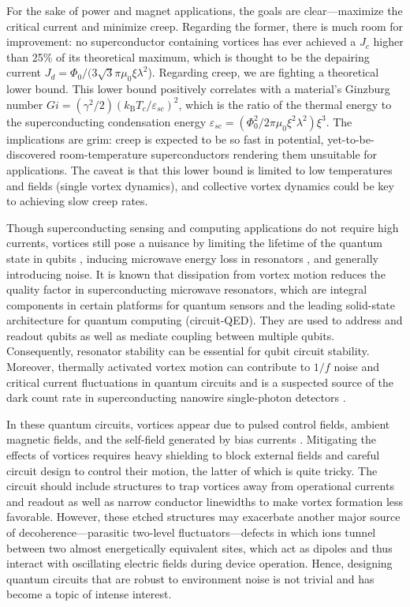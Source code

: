 \documentclass[%
 aip,
 amsmath,amssymb,
 reprint,%
floatfix]{revtex4-1}
\newcommand{\Tc}{T_{c}}
\newcommand{\Jc}{J_{c}}
\newcommand{\Jdp}{J_{d}}
\newcommand{\kB}{k_{\mathrm{B}}}
\begin{document}
For the sake of power and magnet applications, the goals are clear---maximize the critical current and minimize creep. Regarding the former, there is much room for improvement: no superconductor containing vortices has ever achieved a $\Jc$ higher than 25\% of its theoretical maximum, which is thought to be the depairing current $\Jdp=\Phi_0/(3\sqrt{3}\pi\mu_0 \xi \lambda^2$).  Regarding creep, we are fighting a theoretical lower bound.\cite{Eley2017a} This lower bound positively correlates with a material's Ginzburg number $Gi = (\gamma^2/2)(\kB \Tc/ \varepsilon_{sc})^2$, which is the ratio of the thermal energy to the superconducting condensation energy $\varepsilon_{sc} = (\Phi_{0}^{2} / 2 \pi \mu_{0} \xi^{2} \lambda^{2}) \xi^{3}$. The implications are grim: creep is expected to be so fast in potential, yet-to-be-discovered room-temperature superconductors rendering them unsuitable for applications. The caveat is that this lower bound is limited to low temperatures and fields (single vortex dynamics), and collective vortex dynamics could be key to achieving slow creep rates.

Though superconducting sensing and computing applications do not require high currents, vortices still pose a nuisance by limiting the lifetime of the quantum state in qubits \cite{Oliver2013}, inducing microwave energy loss in resonators \cite{Song2009a}, and generally introducing noise.  It is known that dissipation from vortex motion reduces the quality factor in superconducting microwave resonators, which are integral components in certain platforms for quantum sensors and the leading solid-state architecture for quantum computing (circuit-QED)\cite{Wallraff2004, Blais2004, Krantz2019, Muller2019}.  They are used to address and readout qubits as well as mediate coupling between multiple qubits. Consequently, resonator stability can be essential for qubit circuit stability.  Moreover, thermally activated vortex motion can contribute to $1/f$ noise and critical current fluctuations \cite{Trabaldo2019, VanHarlingen2004} in quantum circuits and is a suspected source of the dark count rate in superconducting nanowire single-photon detectors \cite{PhysRevB.83.144526, Yamashita2013}.



In these quantum circuits, vortices appear due to pulsed control fields, ambient magnetic fields\cite{Song2009}, and the self-field generated by bias currents \cite{Yamashita2013}.  Mitigating the effects of vortices requires heavy shielding to block external fields and careful circuit design to control their motion, the latter of which is quite tricky.  The circuit should include structures to trap vortices away from operational currents and readout as well as narrow conductor linewidths\cite{Stan2004} to make vortex formation less favorable.  However, these etched structures may exacerbate another major source of decoherence---parasitic two-level fluctuators---defects in which ions tunnel between two almost energetically equivalent sites, which act as dipoles and thus interact with oscillating electric fields during device operation.\cite{Muller2019}  Hence, designing quantum circuits that are robust to environment noise is not trivial and has become a topic of intense interest.\cite{Muller2019, Oliver2013}
\end{document}
